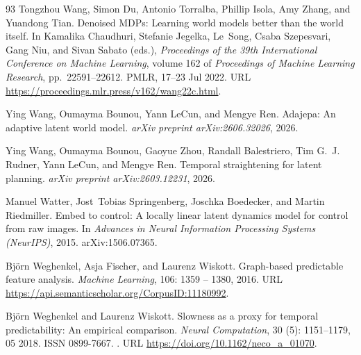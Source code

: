 \begin{thebibliography}{93}
Tongzhou Wang, Simon Du, Antonio Torralba, Phillip Isola, Amy Zhang, and
  Yuandong Tian.
\newblock Denoised {MDP}s: Learning world models better than the world itself.
\newblock In Kamalika Chaudhuri, Stefanie Jegelka, Le~Song, Csaba Szepesvari,
  Gang Niu, and Sivan Sabato (eds.), \emph{Proceedings of the 39th
  International Conference on Machine Learning}, volume 162 of
  \emph{Proceedings of Machine Learning Research}, pp.\  22591--22612. PMLR,
  17--23 Jul 2022.
\newblock URL \url{https://proceedings.mlr.press/v162/wang22c.html}.

Ying Wang, Oumayma Bounou, Yann LeCun, and Mengye Ren.
\newblock Adajepa: An adaptive latent world model.
\newblock \emph{arXiv preprint arXiv:2606.32026}, 2026{}.

Ying Wang, Oumayma Bounou, Gaoyue Zhou, Randall Balestriero, Tim G.~J. Rudner,
  Yann LeCun, and Mengye Ren.
\newblock Temporal straightening for latent planning.
\newblock \emph{arXiv preprint arXiv:2603.12231}, 2026{}.

Manuel Watter, Jost~Tobias Springenberg, Joschka Boedecker, and Martin
  Riedmiller.
\newblock Embed to control: A locally linear latent dynamics model for control
  from raw images.
\newblock In \emph{Advances in Neural Information Processing Systems
  (NeurIPS)}, 2015.
\newblock arXiv:1506.07365.

Bj{\"o}rn Weghenkel, Asja Fischer, and Laurenz Wiskott.
\newblock Graph-based predictable feature analysis.
\newblock \emph{Machine Learning}, 106: 1359 -- 1380, 2016.
\newblock URL \url{https://api.semanticscholar.org/CorpusID:11180992}.

Björn Weghenkel and Laurenz Wiskott.
\newblock Slowness as a proxy for temporal predictability: An empirical
  comparison.
\newblock \emph{Neural Computation}, 30 (5): 1151--1179, 05
  2018.
\newblock ISSN 0899-7667.
\newblock {}.
\newblock URL \url{https://doi.org/10.1162/neco_a_01070}.


\end{thebibliography}
